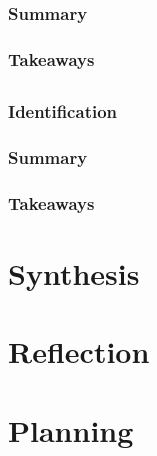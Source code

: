 \documentclass[
	letterpaper, %
]{jdf}
\begin{document}
\subsubsection{Summary}


\subsubsection{Takeaways}


\subsection{}
\subsubsection{Identification}

\subsubsection{Summary}


\subsubsection{Takeaways}


\section{Synthesis}



\section{Reflection}


\section{Planning}


\printbibliography{}
\end{document}
